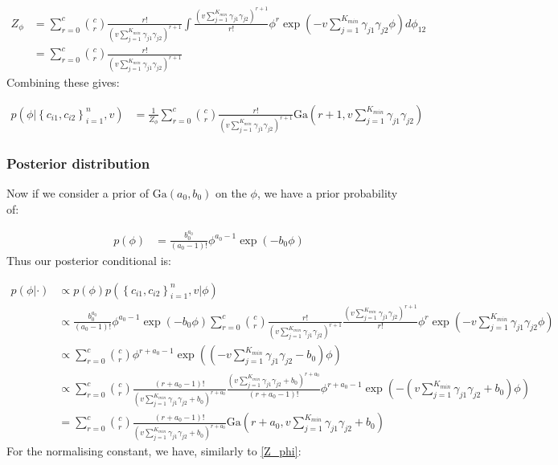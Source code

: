 \documentclass[fleqn,11pt]{wlscirep}
\begin{document}
\begin{align}
Z_{\phi} &= \sum_{r=0}^c   \binom{c}{r} \frac{r!}{\left(v \sum_{j=1}^{K_{min}} \gamma_{j1} \gamma_{j2}\right)^{r+1}}  \int\frac{\left(v \sum_{j=1}^{K_{min}} \gamma_{j1} \gamma_{j2}\right)^{r+1}}{r!}\phi^r \exp\left(-v \sum_{j=1}^{K_{min}} \gamma_{j1} \gamma_{j2}\phi \right) d\phi_{12} \\
&= \sum_{r=0}^c  \binom{c}{r} \frac{r!}{\left(v \sum_{j=1}^{K_{min}} \gamma_{j1} \gamma_{j2}\right)^{r+1}}  \label{Z_phi}
\end{align}
Combining these gives:

\begin{align}
p(\phi | \left\{c_{i1}, c_{i2}\right\}_{i=1}^n, v) &= \frac{1}{Z_{\phi}}  \sum_{r=0}^c  \binom{c}{r} \frac{r!}{\left(v \sum_{j=1}^{K_{min}} \gamma_{j1} \gamma_{j2}\right)^{r+1}} \mathrm{Ga}\left(r+1, v \sum_{j=1}^{K_{min}} \gamma_{j1} \gamma_{j2} \right)
\end{align}

\subsubsection{Posterior distribution}

Now if we consider a prior of $\mathrm{Ga}(a_0, b_0)$ on the $\phi$, we have a prior probability of:

\begin{align}
p(\phi) &= \frac{b_0^{a_0}}{(a_0 - 1)!}\phi^{a_0 - 1}\exp\left(-b_0 \phi \right)
\end{align}
Thus our posterior conditional is:

\begin{align}
p(\phi | \cdot) &\propto p(\phi) p(\left\{c_{i1}, c_{i2}\right\}_{i=1}^n, v | \phi)  \\
&\propto \frac{b_0^{a_0}}{(a_0 - 1)!}\phi^{a_0 - 1}\exp\left(-b_0 \phi \right)  \sum_{r=0}^c  \binom{c}{r} \frac{r!}{\left(v \sum_{j=1}^{K_{min}} \gamma_{j1} \gamma_{j2}\right)^{r+1}}  \frac{\left(v \sum_{j=1}^{K_{min}} \gamma_{j1} \gamma_{j2}\right)^{r+1}}{r!}\phi^r \exp\left(-v \sum_{j=1}^{K_{min}} \gamma_{j1} \gamma_{j2}\phi \right) \\
&\propto \sum_{r=0}^c  \binom{c}{r} \phi^{r + a_0 - 1} \exp \left( \left(-v \sum_{j=1}^{K_{min}} \gamma_{j1} \gamma_{j2}  -b_0 \right)\phi \right) \\
&\propto \sum_{r=0}^c  \binom{c}{r} \frac{(r + a_0 - 1)!}{ \left(v \sum_{j=1}^{K_{min}} \gamma_{j1} \gamma_{j2} + b_0 \right)^{r + a_0}} \frac{ \left(v \sum_{j=1}^{K_{min}} \gamma_{j1} \gamma_{j2} + b_0 \right)^{r + a_0}}{(r + a_0 - 1)!} \phi^{r + a_0 - 1} \exp \left( - \left(v \sum_{j=1}^{K_{min}} \gamma_{j1} \gamma_{j2} + b_0 \right)\phi\right) \\
&= \sum_{r=0}^c  \binom{c}{r} \frac{(r + a_0 - 1)!}{ \left(v \sum_{j=1}^{K_{min}} \gamma_{j1} \gamma_{j2} + b_0 \right)^{r + a_0}} \mathrm{Ga} \left(r+ a_0, v \sum_{j=1}^{K_{min}} \gamma_{j1} \gamma_{j2} + b_0 \right)
\end{align}
For the normalising constant, we have, similarly to \eqref{Z_phi}:
\end{document}
